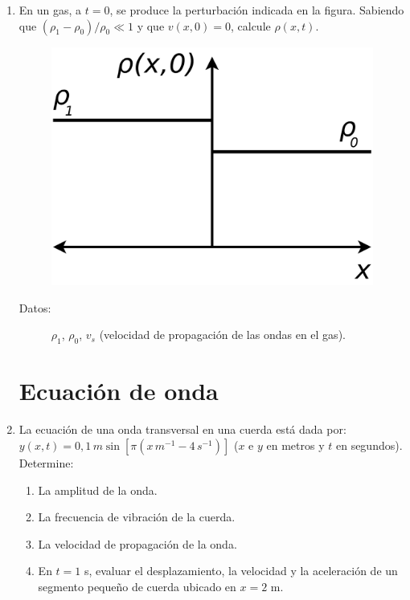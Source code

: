 \documentclass[11pt,spanish,a4paper]{article}
\begin{document}
\begin{enumerate}
\item En un gas, a $t=0$, se produce la perturbación indicada en la figura.
Sabiendo que $(\rho_{1}-\rho_{0})/\rho_{0}\ll1$ y que $v(x,0)=0$,
calcule $\rho(x,t)$.
\begin{figure}[H]
\centering{}\includegraphics[clip,scale=0.25]{ej2-5}
\end{figure}
\begin{description}
\item [{Datos:}] $\rho_{1}$, $\rho_{0}$, $v_{s}$ (velocidad de propagación
de las ondas en el gas).
\end{description}


\section*{Ecuación de onda}

\item La ecuación de una onda transversal en una cuerda está dada por: $y(x,t)=0,1\unit{\, m}\sin\left[\pi\left(x\unit{\, m^{-1}-4\unit{\, s^{-1}}}\right)\right]$
($x$ e $y$ en metros y $t$ en segundos). Determine:
\begin{enumerate}
\item La amplitud de la onda.
\item La frecuencia de vibración de la cuerda.
\item La velocidad de propagación de la onda.
\item En $t=1$ s, evaluar el desplazamiento, la velocidad y la aceleración
de un segmento pequeño de cuerda ubicado en $x=2$ m.
\end{enumerate}



\end{enumerate}
\end{document}
